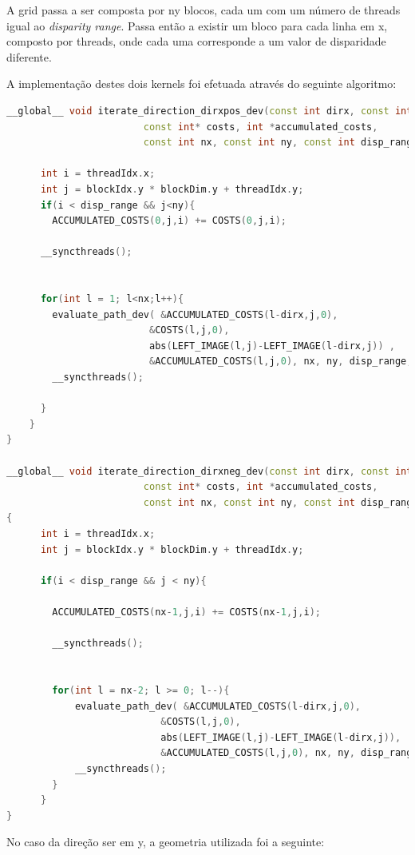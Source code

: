 \documentclass[pdftex,12pt,a4paper]{report}
\begin{document}
A grid passa a ser composta por ny blocos, cada um com um número de threads igual ao \textit{disparity range}. Passa então a existir um bloco para cada linha em x, composto por threads, onde cada uma corresponde a um valor de disparidade diferente.

A implementação destes dois kernels foi efetuada através do seguinte algoritmo:

 \begin{lstlisting}[language=c++, basicstyle=\scriptsize]
__global__ void iterate_direction_dirxpos_dev(const int dirx, const int *left_image,
                        const int* costs, int *accumulated_costs,
                        const int nx, const int ny, const int disp_range ){

      int i = threadIdx.x;
      int j = blockIdx.y * blockDim.y + threadIdx.y;
      if(i < disp_range && j<ny){
        ACCUMULATED_COSTS(0,j,i) += COSTS(0,j,i);

      __syncthreads();


      for(int l = 1; l<nx;l++){
        evaluate_path_dev( &ACCUMULATED_COSTS(l-dirx,j,0),
                         &COSTS(l,j,0),
                         abs(LEFT_IMAGE(l,j)-LEFT_IMAGE(l-dirx,j)) ,
                         &ACCUMULATED_COSTS(l,j,0), nx, ny, disp_range, i);
        __syncthreads();

      }
    }
}

__global__ void iterate_direction_dirxneg_dev(const int dirx, const int *left_image,
                        const int* costs, int *accumulated_costs,
                        const int nx, const int ny, const int disp_range )
{
      int i = threadIdx.x;
      int j = blockIdx.y * blockDim.y + threadIdx.y;

      if(i < disp_range && j < ny){

        ACCUMULATED_COSTS(nx-1,j,i) += COSTS(nx-1,j,i);

        __syncthreads();


        for(int l = nx-2; l >= 0; l--){
            evaluate_path_dev( &ACCUMULATED_COSTS(l-dirx,j,0),
                           &COSTS(l,j,0),
                           abs(LEFT_IMAGE(l,j)-LEFT_IMAGE(l-dirx,j)),
                           &ACCUMULATED_COSTS(l,j,0), nx, ny, disp_range, i);
            __syncthreads();
        }
      }
}
\end{lstlisting} 

\newpage
No caso da direção ser em y, a geometria utilizada foi a seguinte:
\end{document}

